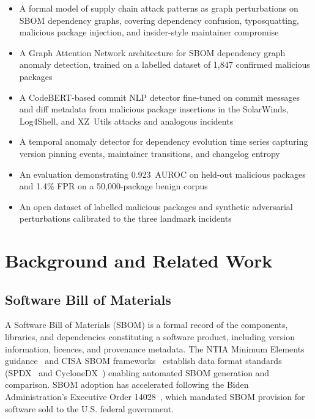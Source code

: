 \documentclass[sigconf,nonacm]{acmart}
\begin{document}
\begin{itemize}
  \item A formal model of supply chain attack patterns as graph perturbations on
        SBOM dependency graphs, covering dependency confusion, typosquatting,
        malicious package injection, and insider-style maintainer compromise
  \item A Graph Attention Network architecture for SBOM dependency graph anomaly
        detection, trained on a labelled dataset of 1,847 confirmed malicious packages
  \item A CodeBERT-based commit NLP detector fine-tuned on commit messages and
        diff metadata from malicious package insertions in the SolarWinds,
        Log4Shell, and XZ~Utils attacks and analogous incidents
  \item A temporal anomaly detector for dependency evolution time series capturing
        version pinning events, maintainer transitions, and changelog entropy
  \item An evaluation demonstrating 0.923~AUROC on held-out malicious packages
        and 1.4\% FPR on a 50,000-package benign corpus
  \item An open dataset of labelled malicious packages and synthetic adversarial
        perturbations calibrated to the three landmark incidents
\end{itemize}

\section{Background and Related Work}

\subsection{Software Bill of Materials}

A Software Bill of Materials (SBOM) is a formal record of the components, libraries,
and dependencies constituting a software product, including version information,
licences, and provenance metadata. The NTIA Minimum Elements
guidance~\cite{ntia2021sbom} and CISA SBOM frameworks~\cite{cisa2023sbom} establish
data format standards (SPDX~\cite{spdx22} and CycloneDX~\cite{cyclonedx14}) enabling
automated SBOM generation and comparison. SBOM adoption has accelerated following the
Biden Administration's Executive Order 14028~\cite{eo14028}, which mandated SBOM
provision for software sold to the U.S. federal government.
\end{document}
